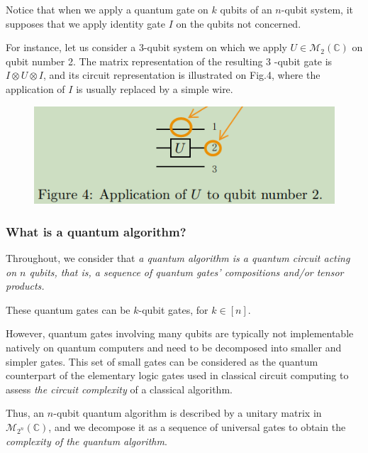 Notice that when we apply a quantum gate on $k$ qubits of an $n$-qubit system, it supposes that we apply identity gate $I$ on the qubits not concerned. 

\begin{example}
For instance, let us consider a 3-qubit system on which we apply $U \in \mathcal{M}_{2}(\mathbb{C})$ on qubit number 2. The matrix representation of the resulting 3 -qubit gate is $I \otimes U \otimes I$, and its circuit representation is illustrated on Fig.4, where the application of $I$ is usually replaced by a simple wire.
    \begin{figure}
    \centering
    \includegraphics[width=0.5\linewidth]{Images/grange2023-3.png}
\end{figure}
\end{example}

\subsubsection{What is a quantum algorithm?}

Throughout, we consider that \textit{a quantum algorithm is a quantum circuit acting on $n$ qubits, that is, a sequence of quantum gates' compositions and/or tensor products. } %

These quantum gates can be $k$-qubit gates, for $k \in[n]$. %

However, quantum gates involving many qubits are typically not implementable natively on quantum computers and need to be decomposed into smaller and simpler gates. This set of small gates can be considered as the quantum counterpart of the elementary logic gates used in classical circuit computing to assess \textit{the circuit complexity} of a classical algorithm. %

Thus, an $n$-qubit quantum algorithm is described by a unitary matrix in $\mathcal{M}_{2^{n}}(\mathbb{C})$, and we decompose it as a sequence of universal gates to obtain the \textit{complexity of the quantum algorithm}. %

